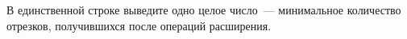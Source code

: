 В единственной строке выведите одно целое число~--- минимальное количество отрезков, получившихся после операций расширения.